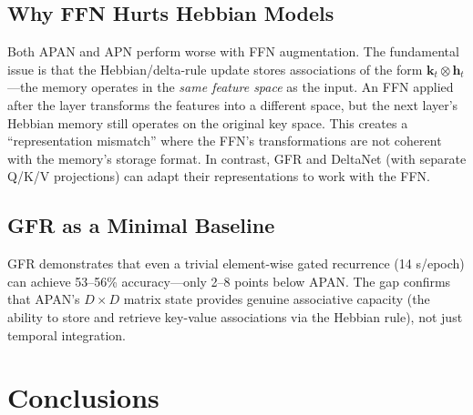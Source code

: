 \documentclass[11pt,a4paper]{article}
\begin{document}
\subsection{Why FFN Hurts Hebbian Models}

Both APAN and APN perform worse with FFN augmentation.
The fundamental issue is that the Hebbian/delta-rule update stores associations of the form $\mathbf{k}_t \otimes \mathbf{h}_t$---the memory operates in the \emph{same feature space} as the input.
An FFN applied after the layer transforms the features into a different space, but the next layer's Hebbian memory still operates on the original key space.
This creates a ``representation mismatch'' where the FFN's transformations are not coherent with the memory's storage format.
In contrast, GFR and DeltaNet (with separate Q/K/V projections) can adapt their representations to work with the FFN.

\subsection{GFR as a Minimal Baseline}

GFR demonstrates that even a trivial element-wise gated recurrence (14 s/epoch) can achieve 53--56\% accuracy---only 2--8 points below APAN.
The gap confirms that APAN's $D{\times}D$ matrix state provides genuine associative capacity (the ability to store and retrieve key-value associations via the Hebbian rule), not just temporal integration.

\section{Conclusions}
\end{document}

